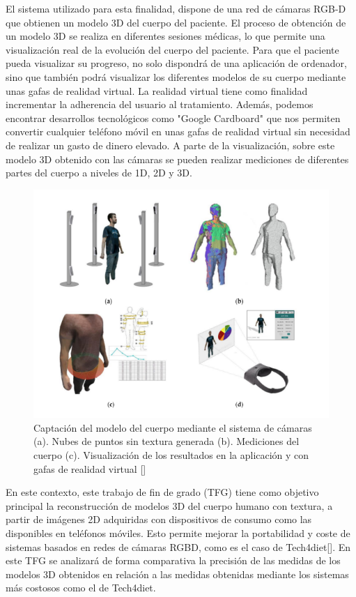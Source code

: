 	El sistema utilizado para esta finalidad, dispone de una red de cámaras RGB-D que
	obtienen un modelo 3D del cuerpo del paciente. El proceso de obtención de un modelo 3D se realiza en diferentes sesiones médicas, lo que permite una visualización real de la evolución del cuerpo del paciente. Para que el paciente pueda visualizar su progreso, no solo dispondrá de una aplicación de ordenador, sino que también podrá visualizar los diferentes modelos de su cuerpo mediante unas gafas de realidad virtual. La realidad virtual tiene como finalidad incrementar la adherencia del usuario al tratamiento. Además, podemos encontrar desarrollos tecnológicos como "Google Cardboard" que nos permiten convertir cualquier teléfono móvil en unas gafas de realidad virtual sin necesidad de realizar un gasto de dinero elevado.
	A parte de la visualización, sobre este modelo 3D obtenido con las cámaras se pueden realizar mediciones de diferentes partes del cuerpo a niveles de 1D, 2D y 3D. 
	
	\begin{figure}[H]
		\centering
		\includegraphics[scale=0.7]{imagenes/intro1.png}
		\caption{Captación del modelo del cuerpo mediante el sistema de cámaras (a). Nubes de puntos sin textura generada (b). Mediciones del cuerpo (c). Visualización de los resultados en la aplicación y con gafas de realidad virtual [\cite{Nahuel1}]}
		\label{fig:figura1}
	\end{figure}

	En este contexto, este trabajo de fin de grado (TFG) tiene como objetivo principal la reconstrucción de modelos 3D del cuerpo humano con textura, a partir de imágenes 2D  adquiridas con dispositivos de consumo como las disponibles en teléfonos móviles. Esto permite mejorar la portabilidad y coste de sistemas basados en redes de cámaras RGBD, como es el caso de Tech4diet[\cite{tech}]. En este TFG se analizará de forma comparativa la precisión de las medidas de los modelos 3D obtenidos en relación a las medidas obtenidas mediante los sistemas más costosos como el de Tech4diet.


